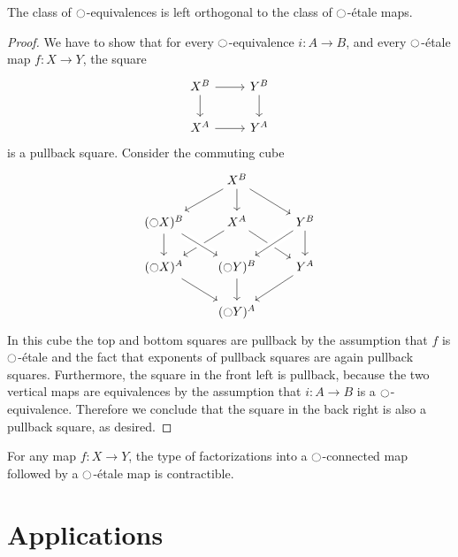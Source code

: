\documentclass[9pt,twosided]{amsart}
\begin{document}
\begin{lem}\label{lem:rfs_orthogonal}
The class of ${\ocircle}$-equivalences is left orthogonal to the class of ${\ocircle}$-\'etale maps.
\end{lem}

\begin{proof}
We have to show that for every ${\ocircle}$-equivalence $i:A\to B$, and every ${\ocircle}$-\'etale map $f:X\to Y$, the square
\begin{equation*}
\begin{tikzcd}
X^B \arrow[r] \arrow[d] & Y^B \arrow[d] \\
X^A \arrow[r] & Y^A
\end{tikzcd}
\end{equation*}
is a pullback square. Consider the commuting cube
\begin{equation*}
\begin{tikzcd}
&[-1ex] X^B \arrow[dl] \arrow[d] \arrow[dr] \\
(\modal X)^B \arrow[d] & X^A \arrow[dl] \arrow[dr] & Y^B \arrow[d] \arrow[dl,crossing over] \\
(\modal X)^A \arrow[dr] & (\modal Y)^B \arrow[from=ul,crossing over] \arrow[d] & Y^A \arrow[dl] \\
& (\modal Y)^A
\end{tikzcd}
\end{equation*}
In this cube the top and bottom squares are pullback by the assumption that $f$ is ${\ocircle}$-\'etale and the fact that exponents of pullback squares are again pullback squares. Furthermore, the square in the front left is pullback, because the two vertical maps are equivalences by the assumption that $i:A\to B$ is a ${\ocircle}$-equivalence. Therefore we conclude that the square in the back right is also a pullback square, as desired.
\end{proof}

\begin{cor}
For any map $f:X\to Y$, the type of factorizations into a ${\ocircle}$-connected map followed by a ${\ocircle}$-\'etale map is contractible.
\end{cor}

\section{Applications}
\end{document}
